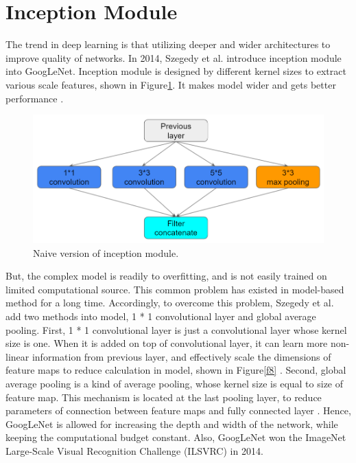 \section{Inception Module}
The trend in deep learning is that utilizing deeper and wider architectures to improve quality of networks. In 2014, Szegedy et al. introduce inception module into GoogLeNet. Inception module is designed by different kernel sizes to extract various scale features, shown in Figure\ref{f7}. It makes model wider and gets better performance \cite{szegedy2015going}.

\begin{figure}[H]
    \centering
    \includegraphics[width=0.8\columnwidth]{body/figure/figure7.png}
    \captionsetup{labelfont=bf}
    \renewcommand{\baselinestretch}{1.0}
    \caption[Naive version of inception module]{Naive version of inception module.}
    \label{f7}
\end{figure}

But, the complex model is readily to overfitting, and is not easily trained on limited computational source. This common problem has existed in model-based method for a long time. Accordingly, to overcome this problem, Szegedy et al. add two methods into model, 1 * 1 convolutional layer and global average pooling. First, 1 * 1 convolutional layer is just a convolutional layer whose kernel size is one. When it is added on top of convolutional layer, it can learn more non-linear information from previous layer, and effectively scale the dimensions of feature maps to reduce calculation in model, shown in Figure\ref{f8} \cite{lin2013network}. Second, global average pooling is a kind of average pooling, whose kernel size is equal to size of feature map. This mechanism is located at the last pooling layer, to reduce parameters of connection between feature maps and fully connected layer \cite{lin2013network}. Hence, GoogLeNet is allowed for increasing the depth and width of the network, while keeping the computational budget constant. Also, GoogLeNet won the ImageNet Large-Scale Visual Recognition Challenge (ILSVRC) in 2014.

